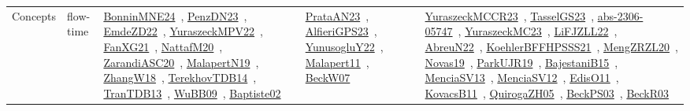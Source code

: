 {\begin{longtable}{lp{3cm}>{\raggedright\arraybackslash}p{6cm}>{\raggedright\arraybackslash}p{6cm}>{\raggedright\arraybackslash}p{8cm}}
Concepts & flow-time & \href{../works/BonninMNE24.pdf}{BonninMNE24}~\cite{BonninMNE24}, \href{../works/PenzDN23.pdf}{PenzDN23}~\cite{PenzDN23}, \href{../works/EmdeZD22.pdf}{EmdeZD22}~\cite{EmdeZD22}, \href{../works/YuraszeckMPV22.pdf}{YuraszeckMPV22}~\cite{YuraszeckMPV22}, \href{../works/FanXG21.pdf}{FanXG21}~\cite{FanXG21}, \href{../works/NattafM20.pdf}{NattafM20}~\cite{NattafM20}, \href{../works/ZarandiASC20.pdf}{ZarandiASC20}~\cite{ZarandiASC20}, \href{../works/MalapertN19.pdf}{MalapertN19}~\cite{MalapertN19}, \href{../works/ZhangW18.pdf}{ZhangW18}~\cite{ZhangW18}, \href{../works/TerekhovTDB14.pdf}{TerekhovTDB14}~\cite{TerekhovTDB14}, \href{../works/TranTDB13.pdf}{TranTDB13}~\cite{TranTDB13}, \href{../works/WuBB09.pdf}{WuBB09}~\cite{WuBB09}, \href{../works/Baptiste02.pdf}{Baptiste02}~\cite{Baptiste02} & \href{../works/PrataAN23.pdf}{PrataAN23}~\cite{PrataAN23}, \href{../works/AlfieriGPS23.pdf}{AlfieriGPS23}~\cite{AlfieriGPS23}, \href{../works/YunusogluY22.pdf}{YunusogluY22}~\cite{YunusogluY22}, \href{../works/Malapert11.pdf}{Malapert11}~\cite{Malapert11}, \href{../works/BeckW07.pdf}{BeckW07}~\cite{BeckW07} & \href{../works/YuraszeckMCCR23.pdf}{YuraszeckMCCR23}~\cite{YuraszeckMCCR23}, \href{../works/TasselGS23.pdf}{TasselGS23}~\cite{TasselGS23}, \href{../works/abs-2306-05747.pdf}{abs-2306-05747}~\cite{abs-2306-05747}, \href{../works/YuraszeckMC23.pdf}{YuraszeckMC23}~\cite{YuraszeckMC23}, \href{../works/LiFJZLL22.pdf}{LiFJZLL22}~\cite{LiFJZLL22}, \href{../works/AbreuN22.pdf}{AbreuN22}~\cite{AbreuN22}, \href{../works/KoehlerBFFHPSSS21.pdf}{KoehlerBFFHPSSS21}~\cite{KoehlerBFFHPSSS21}, \href{../works/MengZRZL20.pdf}{MengZRZL20}~\cite{MengZRZL20}, \href{../works/Novas19.pdf}{Novas19}~\cite{Novas19}, \href{../works/ParkUJR19.pdf}{ParkUJR19}~\cite{ParkUJR19}, \href{../works/BajestaniB15.pdf}{BajestaniB15}~\cite{BajestaniB15}, \href{../works/MenciaSV13.pdf}{MenciaSV13}~\cite{MenciaSV13}, \href{../works/MenciaSV12.pdf}{MenciaSV12}~\cite{MenciaSV12}, \href{../works/EdisO11.pdf}{EdisO11}~\cite{EdisO11}, \href{../works/KovacsB11.pdf}{KovacsB11}~\cite{KovacsB11}, \href{../works/QuirogaZH05.pdf}{QuirogaZH05}~\cite{QuirogaZH05}, \href{../works/BeckPS03.pdf}{BeckPS03}~\cite{BeckPS03}, \href{../works/BeckR03.pdf}{BeckR03}~\cite{BeckR03}\\

\end{longtable}}
